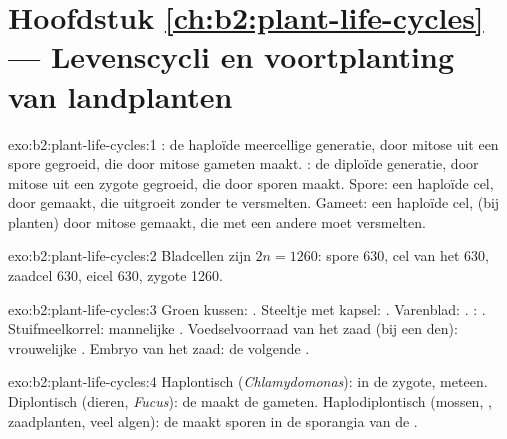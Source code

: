 \section*{Hoofdstuk \ref{ch:b2:plant-life-cycles} --- Levenscycli en voortplanting van landplanten}

\begin{solution}{exo:b2:plant-life-cycles:1}
: de haploïde meercellige generatie, door mitose uit een spore
gegroeid, die door mitose gameten maakt. : de diploïde
generatie, door mitose uit een zygote gegroeid, die door  sporen
maakt. Spore: een haploïde cel, door  gemaakt, die uitgroeit zonder
te versmelten. Gameet: een haploïde cel, (bij planten) door mitose
gemaakt, die met een andere moet versmelten.
\end{solution}

\begin{solution}{exo:b2:plant-life-cycles:2}
Bladcellen zijn $2n = 1260$: spore 630, cel van het  630,
zaadcel 630, eicel 630, zygote 1260.
\end{solution}

\begin{solution}{exo:b2:plant-life-cycles:3}
Groen kussen: . Steeltje met kapsel: . Varenblad:
. : . Stuifmeelkorrel: mannelijke
. Voedselvoorraad van het zaad (bij een den): vrouwelijke
. Embryo van het zaad: de volgende .
\end{solution}

\begin{solution}{exo:b2:plant-life-cycles:4}
Haplontisch (\emph{Chlamydomonas}):  in de zygote, meteen.
Diplontisch (dieren, \emph{Fucus}): de  maakt de gameten.
Haplodiplontisch (mossen, , zaadplanten, veel algen): de 
maakt sporen in de sporangia van de .
\end{solution}

